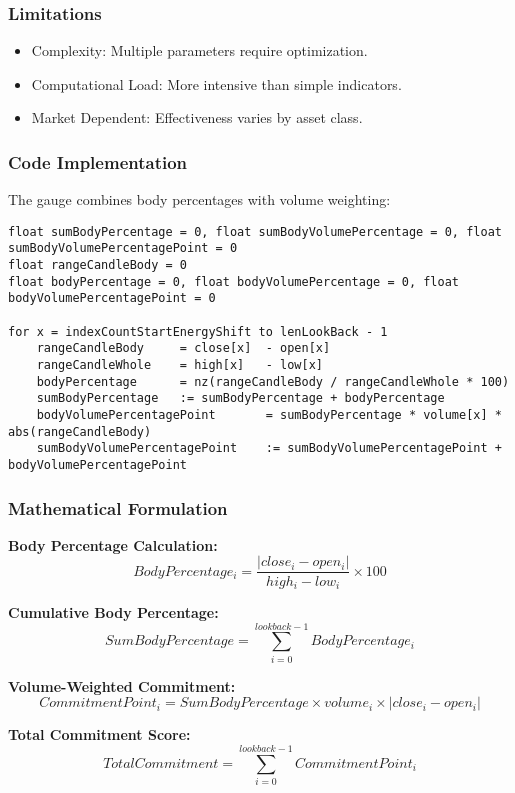 \documentclass[12pt]{article}
\begin{document}
\subsubsection{Limitations}
\begin{itemize}
\item Complexity: Multiple parameters require optimization.
\item Computational Load: More intensive than simple indicators.
\item Market Dependent: Effectiveness varies by asset class.
\end{itemize}

\subsubsection{Code Implementation}
The gauge combines body percentages with volume weighting:

\begin{lstlisting}[language=Pine, caption=Pine Script Code for Commitment Gauge]
float sumBodyPercentage = 0, float sumBodyVolumePercentage = 0, float sumBodyVolumePercentagePoint = 0
float rangeCandleBody = 0
float bodyPercentage = 0, float bodyVolumePercentage = 0, float bodyVolumePercentagePoint = 0

for x = indexCountStartEnergyShift to lenLookBack - 1
    rangeCandleBody     = close[x]  - open[x]
    rangeCandleWhole    = high[x]   - low[x]
    bodyPercentage      = nz(rangeCandleBody / rangeCandleWhole * 100)
    sumBodyPercentage   := sumBodyPercentage + bodyPercentage
    bodyVolumePercentagePoint       = sumBodyPercentage * volume[x] * abs(rangeCandleBody)
    sumBodyVolumePercentagePoint    := sumBodyVolumePercentagePoint + bodyVolumePercentagePoint
\end{lstlisting}

\subsubsection{Mathematical Formulation}
\textbf{Body Percentage Calculation:}
\[
BodyPercentage_i = \frac{|close_i - open_i|}{high_i - low_i} \times 100
\]

\textbf{Cumulative Body Percentage:}
\[
SumBodyPercentage = \sum_{i=0}^{lookback-1} BodyPercentage_i
\]

\textbf{Volume-Weighted Commitment:}
\[
CommitmentPoint_i = SumBodyPercentage \times volume_i \times |close_i - open_i|
\]

\textbf{Total Commitment Score:}
\[
TotalCommitment = \sum_{i=0}^{lookback-1} CommitmentPoint_i
\]
\end{document}
